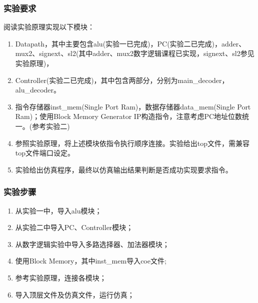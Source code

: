 \subsubsection{实验要求}
阅读实验原理实现以下模块：
\begin{enumerate}[(1)]
    \item Datapath，其中主要包含alu(实验一已完成)，PC(实验二已完成)，adder、mux2、signext、sl2(其中adder、mux2数字逻辑课程已实现，signext、sl2参见实验原理)，
    \item Controller(实验二已完成)，其中包含两部分，分别为main\_decoder，alu\_decoder。
    \item 指令存储器inst\_mem(Single Port Ram)，数据存储器data\_mem(Single Port Ram)；使用Block Memory Generator IP构造指令，注意考虑PC地址位数统一。(参考实验二)
    \item 参照实验原理，将上述模块依指令执行顺序连接。实验给出top文件，需兼容top文件端口设定。
    \item 实验给出仿真程序，最终以仿真输出结果判断是否成功实现要求指令。
\end{enumerate}

\subsubsection{实验步骤}
\begin{enumerate}
    \item 从实验一中，导入alu模块；
    \item 从实验二中导入PC、Controller模块；
    \item 从数字逻辑实验中导入多路选择器、加法器模块；
    \item 使用Block Memory，其中inst\_mem导入coe文件;
    \item 参考实验原理，连接各模块；
    \item 导入顶层文件及仿真文件，运行仿真； 
\end{enumerate}

